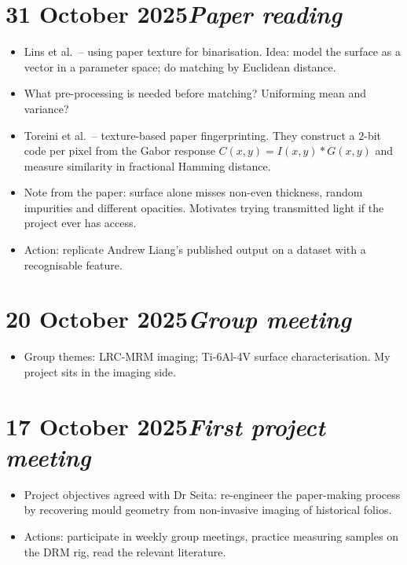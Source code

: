 \documentclass[11pt,a4paper]{article}
\newcommand{\logentry}[2]{\section*{#1\hfill\normalfont\normalsize\textit{#2}}}
\begin{document}
\logentry{31 October 2025}{Paper reading}
\begin{itemize}
  \item Lins et al.\ -- using paper texture for binarisation. Idea: model the surface as a vector in a parameter space; do matching by Euclidean distance.
  \item What pre-processing is needed before matching? Uniforming mean and variance?
  \item Toreini et al.\ -- texture-based paper fingerprinting. They construct a $2$-bit code per pixel from the Gabor response $C(x, y) = I(x, y) \ast G(x, y)$ and measure similarity in fractional Hamming distance.
  \item Note from the paper: surface alone misses non-even thickness, random impurities and different opacities. Motivates trying transmitted light if the project ever has access.
  \item Action: replicate Andrew Liang's published output on a dataset with a recognisable feature.
\end{itemize}

\logentry{20 October 2025}{Group meeting}
\begin{itemize}
  \item Group themes: LRC-MRM imaging; Ti-6Al-4V surface characterisation. My project sits in the imaging side.
\end{itemize}

\logentry{17 October 2025}{First project meeting}
\begin{itemize}
  \item Project objectives agreed with Dr Seita: re-engineer the paper-making process by recovering mould geometry from non-invasive imaging of historical folios.
  \item Actions: participate in weekly group meetings, practice measuring samples on the DRM rig, read the relevant literature.
\end{itemize}
\end{document}
